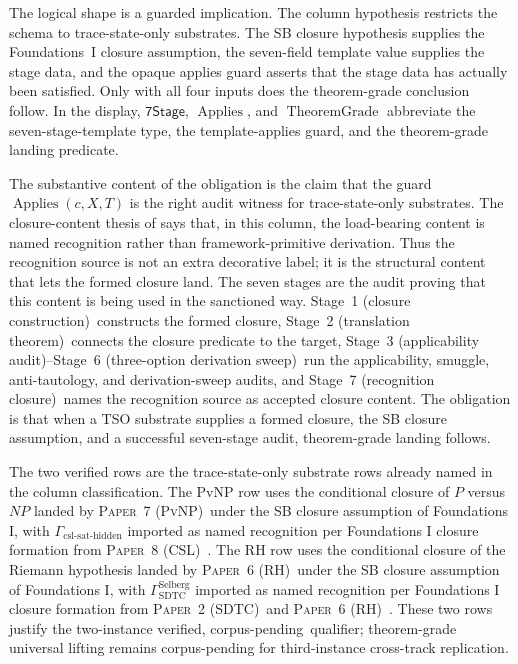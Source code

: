 \documentclass[11pt]{article}
\newcommand{\PaperSDTC}{\textsc{Paper~2 (SDTC)}}
\newcommand{\PaperRH}{\textsc{Paper~6 (RH)}}
\newcommand{\PaperPvNP}{\textsc{Paper~7 (PvNP)}}
\newcommand{\PaperCSL}{\textsc{Paper~8 (CSL)}}
\newcommand{\StageOne}{Stage~1 (closure construction)}
\newcommand{\StageTwo}{Stage~2 (translation theorem)}
\newcommand{\StageThree}{Stage~3 (applicability audit)}
\newcommand{\StageSix}{Stage~6 (three-option derivation sweep)}
\newcommand{\StageSeven}{Stage~7 (recognition closure)}
\newcommand{\TwoInstance}{two-instance verified, corpus-pending}
\theoremstyle{definition}
\begin{document}
The logical shape is a guarded implication.  The column hypothesis
restricts the schema to trace-state-only substrates.  The SB closure
hypothesis supplies the Foundations~I closure assumption, the
seven-field template value supplies the stage data, and the opaque
applies guard asserts that the stage data has actually been satisfied.
Only with all four inputs does the theorem-grade conclusion follow.  In
the display, \(\mathsf{7Stage}\), \(\operatorname{Applies}\), and
\(\operatorname{TheoremGrade}\) abbreviate the seven-stage-template
type, the template-applies guard, and the theorem-grade landing
predicate.

The substantive content of the obligation is the claim that the guard
\(\operatorname{Applies}(c,X,T)\) is the right audit witness for
trace-state-only substrates.  The closure-content thesis of
 says that, in this column, the
load-bearing content is named recognition rather than
framework-primitive derivation.  Thus the recognition source is not an
extra decorative label; it is the structural content that lets the
formed closure land.  The seven stages are the audit proving that this
content is being used in the sanctioned way.  \StageOne\ constructs the
formed closure, \StageTwo\ connects the closure predicate to the target,
\StageThree--\StageSix\ run the applicability, smuggle,
anti-tautology, and derivation-sweep audits, and \StageSeven\ names the
recognition source as accepted closure content.  The obligation is that
when a TSO substrate supplies a formed closure, the SB closure
assumption, and a successful seven-stage audit, theorem-grade landing
follows.

The two verified rows are the trace-state-only substrate rows already
named in the column classification. The PvNP row uses the conditional
closure of \(P\) versus \(NP\) landed by \PaperPvNP\ under the SB closure
assumption of Foundations I, with \(\Gamma_{\text{csl-sat-hidden}}\)
imported as named recognition per Foundations I closure formation from
\PaperCSL\ \cite{Tsiokos2026PvNP,Tsiokos2026CSL}. The RH row uses the
conditional closure of the Riemann hypothesis landed by \PaperRH\ under
the SB closure assumption of Foundations I, with
\(\Gamma_{\text{SDTC}}^{\text{Selberg}}\) imported as named recognition
per Foundations I closure formation from \PaperSDTC\ and \PaperRH\
\cite{Tsiokos2026SDTC,Tsiokos2026RH}. These two rows justify the
\TwoInstance\ qualifier; theorem-grade universal lifting remains
corpus-pending for third-instance cross-track replication.
\end{document}
